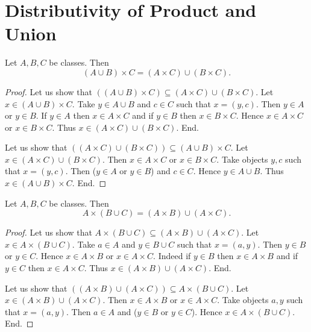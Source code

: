 \documentclass[10pt]{article}
\begin{document}
  \section{Distributivity of Product and Union}

  \begin{forthel}
    \begin{proposition}
      Let $A, B, C$ be classes.
      Then \[ (A \cup B) \times C = (A \times C) \cup (B \times C). \]
    \end{proposition}
    \begin{proof}
      Let us show that $((A \cup B) \times C) \subseteq
      (A \times C) \cup (B \times C).$ %
        Let $x \in (A \cup B) \times C$.
        Take $y \in A \cup B$ and $c \in C$ such that $x = (y, c)$.
        Then $y \in A$ or $y \in B$.
        If $y \in A$ then $x \in A \times C$ and if $y \in B$ then
        $x \in B \times C$.
        Hence $x \in A \times C$ or $x \in B \times C$.
        Thus $x \in (A \times C) \cup (B \times C)$.
      End.

      Let us show that $((A \times C) \cup (B \times C)) \subseteq
      (A \cup B) \times C$. %
        Let $x \in (A \times C) \cup (B \times C)$.
        Then $x \in A \times C$ or $x \in B \times C$.
        Take objects $y, c$ such that $x = (y, c)$.
        Then ($y \in A$ or $y \in B$) and $c \in C$.
        Hence $y \in A \cup B$.
        Thus $x \in (A \cup B) \times C$.
      End.
    \end{proof}
  \end{forthel}

  \begin{forthel}
    \begin{proposition}
      Let $A, B, C$ be classes.
      Then \[ A \times (B \cup C) = (A \times B) \cup (A \times C). \]
    \end{proposition}
    \begin{proof}
      Let us show that $A \times (B \cup C) \subseteq
      (A \times B) \cup (A \times C)$.
        Let $x \in A \times (B \cup C)$.
        Take $a \in A$ and $y \in B \cup C$ such that $x = (a, y)$.
        Then $y \in B$ or $y \in C$.
        Hence $x \in A \times B$ or $x \in A \times C$.
        Indeed if $y \in B$ then $x \in A \times B$ and if $y \in C$ then
        $x \in A \times C$.
        Thus $x \in (A \times B) \cup (A \times C)$.
      End.

      Let us show that $((A \times B) \cup (A \times C)) \subseteq
      A \times (B \cup C)$.
        Let $x \in (A \times B) \cup (A \times C)$.
        Then $x \in A \times B$ or $x \in A \times C$.
        Take objects $a, y$ such that $x = (a, y)$.
        Then $a \in A$ and ($y \in B$ or $y \in C$).
        Hence $x \in A \times (B \cup C)$.
      End.
    \end{proof}
  \end{forthel}
\end{document}

